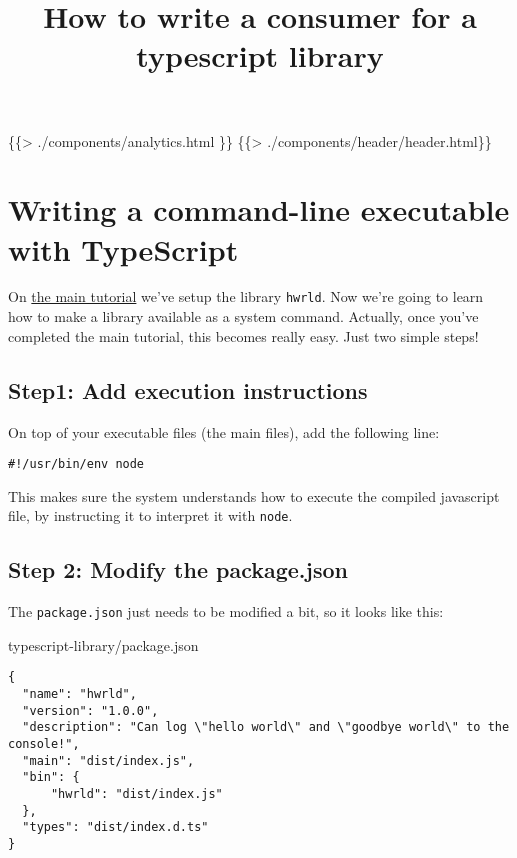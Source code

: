 \documentclass[]{article}
\title{How to write a consumer for a typescript library}
\date{}
\begin{document}
\maketitle

\{\{\textgreater{} ./components/analytics.html \}\} \{\{\textgreater{}
./components/header/header.html\}\}

\section{Writing a command-line executable with
TypeScript}\label{writing-a-command-line-executable-with-typescript}

On \href{/}{the main tutorial} we've setup the library
\texttt{\textquotesingle{}hwrld\textquotesingle{}}. Now we're going to
learn how to make a library available as a system command. Actually,
once you've completed the main tutorial, this becomes really easy. Just
two simple steps!

\subsection{\texorpdfstring{{Step1:} Add execution
instructions}{Step1: Add execution instructions}}\label{step1-add-execution-instructions}

On top of your executable files (the main files), add the following
line:

\begin{verbatim}
#!/usr/bin/env node
\end{verbatim}

This makes sure the system understands how to execute the compiled
javascript file, by instructing it to interpret it with \texttt{node}.

\subsection{\texorpdfstring{{Step 2:} Modify the
package.json}{Step 2: Modify the package.json}}\label{step-2-modify-the-package.json}

The \texttt{package.json} just needs to be modified a bit, so it looks
like this:

typescript-library/package.json

\begin{verbatim}
{
  "name": "hwrld",
  "version": "1.0.0",
  "description": "Can log \"hello world\" and \"goodbye world\" to the console!",
  "main": "dist/index.js",
  "bin": {
      "hwrld": "dist/index.js"
  },
  "types": "dist/index.d.ts"
}
\end{verbatim}
\end{document}
